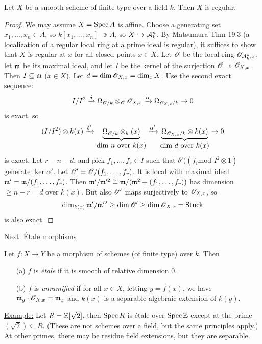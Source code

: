  \begin{proposition}
 Let $X$ be a smooth scheme of finite type over a field $k$.  Then
 $X$ is regular.
 \end{proposition}
 \begin{proof}
 We may assume $X=\text{\rm Spec\,} A$ is affine.  Choose a generating set
 $x_1,\dots ,x_n\in A$, so $k[x_1,\dots, x_n]\twoheadrightarrow
 A$, so $X\hookrightarrow \mathcal{A}^n_k$.  By Matsumura Thm 19.3 (a
 localization of a regular local ring at a prime ideal is
 regular), it suffices to show that $X$ is regular at $x$ for all
 closed points $x\in X$.  Let $\mathscr{O}$ be the local ring
 $\mathscr{O}_{\mathcal{A}^n_k,x}$, let $\mathfrak{m}$ be its maximal ideal, and let $I$ be
 the kernel of the surjection $\mathscr{O}\twoheadrightarrow \mathscr{O}_{X,x}$.
 Then $I\subseteq \mathfrak{m}$ ($x\in X$).  Let $d=\dim \mathscr{O}_{X,x} = \dim_x
 X$.  Use the second exact sequence:
 \[
    I/I^2 \xrightarrow{\delta} \Omega_{\mathscr{O}/k}\otimes_{\mathscr{O}} \mathscr{O}_{X,x} \xrightarrow{\alpha}
    \Omega_{\mathscr{O}_{X,x}/k} \to 0
 \]
 is exact, so
 \[
    (I/I^2) \otimes k(x) \xrightarrow{\delta'}
    \underbrace{\Omega_{\O/k}\otimes_ k(x)}_{\txt{dim $n$ over $k(x)$}} \xrightarrow{\alpha'}
    \underbrace{\Omega_{\O_{X,x}/k}\otimes k(x)}_{\txt{dim $d$ over $k(x)$}} \to 0
 \]
 is exact.
 Let $r-n-d$, and pick $f_1,\dots, f_r\in I$ such that
 $\delta'((f_i \text{mod } I^2\otimes 1)$ generate $\ker \alpha'$.
 Let $\mathscr{O}' = \mathscr{O}/(f_1,\dots, f_r)$.  It is local with maximal ideal
 $\mathfrak{m}' = \mathfrak{m}/(f_1,\dots,f_r)$.  Then $\mathfrak{m}'/\mathfrak{m}'^2 \cong \mathfrak{m}/(\mathfrak{m}^2+(f_1,\dots, f_r))$
 has dimension $\ge n-r=d$ over $k(x)$. But also $\mathscr{O}'$ maps
 surjectively to $\mathscr{O}_{X,x}$, so
 \[
   \dim_{k(x)}\mathfrak{m}'/\mathfrak{m}'^2 \ge \dim \mathscr{O}' \ge \dim \mathscr{O}_{X,x} = \text{Stuck}
 \]
 is also exact.
 \end{proof}

 \underline{Next:} \'{E}tale morphisms

 \begin{definition}[Ex 10.3]
 Let $f:X\to Y$ be a morphism of schemes (of finite type) over
 $k$.  Then
 \begin{itemize}
 \item[(a)] $f$ is \emph{\'{e}tale} if it is smooth of relative dimension
 0.
 \item[(b)] $f$ is \emph{unramified} if for all $x\in X$, letting
 $y=f(x)$, we have $\mathfrak{m}_y \cdot \mathscr{O}_{X,x} = \mathfrak{m}_x$ and $k(x)$ is a
 separable algebraic extension of $k(y)$.
 \end{itemize}
 \end{definition}

 \underline{Example:} Let $R=\mathbb{Z}[\sqrt{2}]$, then $\text{\rm Spec\,} R$ is \'{e}tale
 over $\text{\rm Spec\,} \mathbb{Z}$ except at the prime $(\sqrt{2})\subseteq R$.
 (These are not schemes over a field, but the same principles
 apply.)  At other primes, there may be residue field extensions,
 but they are separable.
